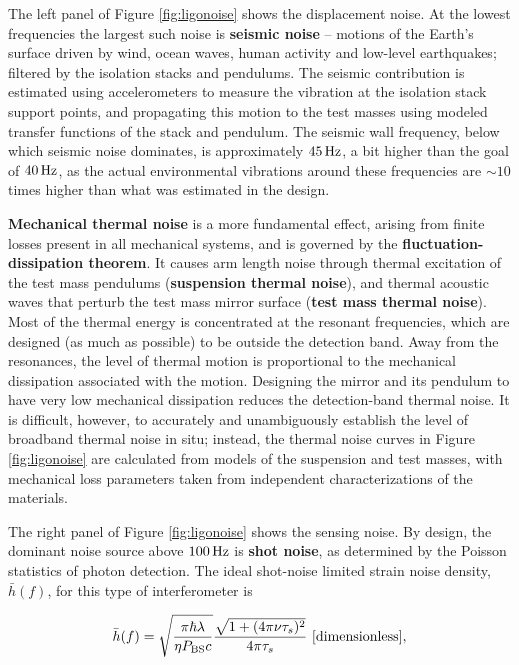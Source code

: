 \documentclass[a4paper,10pt]{article}
\begin{document}
{\noindent}The left panel of Figure \ref{fig:ligonoise} shows the displacement noise. At the lowest frequencies the largest such noise is \textbf{seismic noise} -- motions of the Earth's surface driven by wind, ocean waves, human activity and low-level earthquakes; filtered by the isolation stacks and pendulums. The seismic contribution is estimated using accelerometers to measure the vibration at the isolation stack support points, and propagating this motion to the test masses using modeled transfer functions of the stack and pendulum. The seismic wall frequency, below which seismic noise dominates, is approximately $45\,{\rm Hz}$, a bit higher than the goal of $40\,{\rm Hz}$, as the actual environmental vibrations around these frequencies are $\sim10$ times higher than what was estimated in the design.

{\noindent}\textbf{Mechanical thermal noise} is a more fundamental effect, arising from finite losses present in all mechanical systems, and is governed by the \textbf{fluctuation-dissipation theorem}. It causes arm length noise through thermal excitation of the test mass pendulums (\textbf{suspension thermal noise}), and thermal acoustic waves that perturb the test mass mirror surface (\textbf{test mass thermal noise}). Most of the thermal energy is concentrated at the resonant frequencies, which are designed (as much as possible) to be outside the detection band. Away from the resonances, the level of thermal motion is proportional to the mechanical dissipation associated with the motion. Designing the mirror and its pendulum to have very low mechanical dissipation reduces the detection-band thermal noise. It is difficult, however, to accurately and unambiguously establish the level of broadband thermal noise in situ; instead, the thermal noise curves in Figure \ref{fig:ligonoise} are calculated from models of the suspension and test masses, with mechanical loss parameters taken from independent characterizations of the materials.

{\noindent}The right panel of Figure \ref{fig:ligonoise} shows the sensing noise. By design, the dominant noise source above $100\,{\rm Hz}$ is \textbf{shot noise}, as determined by the Poisson statistics of photon detection. The ideal shot-noise limited strain noise density, $\bar{h}(f)$, for this type of interferometer is

\begin{align*}
    \bar{h}(f) = \sqrt{\frac{\pi\hbar\lambda}{\eta P_{\rm BS}c}} \frac{\sqrt{1+(4\pi \nu\tau_s)^2}}{4\pi\tau_s} ~ [{\rm dimensionless}],
\end{align*}
\end{document}
